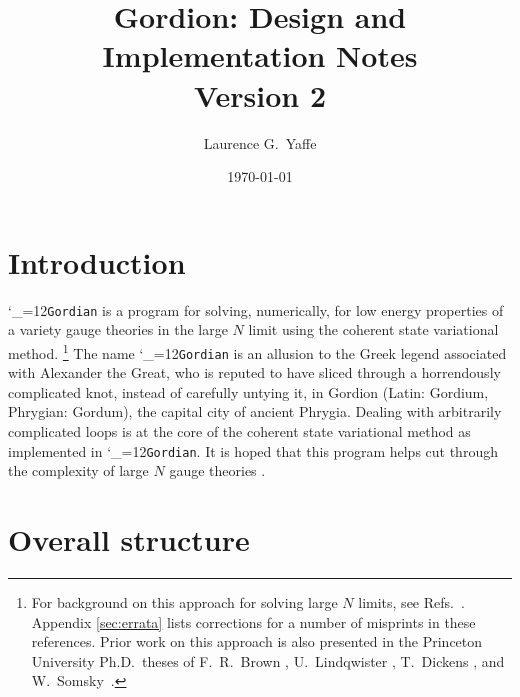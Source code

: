 \documentclass [12pt]{article}
\title
    {
    Gordion: Design and Implementation Notes
    \\[8pt]
    \large Version 2
    }
\date	{\small\today\vspace*{-30pt}}
\author	{Laurence G.~Yaffe}
\affil{%
    \small
    Department of Physics, University of Washington, Seattle WA 98195, USA
    \vspace*{-10pt}
    }%
\makeatletter
\renewcommand{\tt}{\begingroup\catcode`_=12\def\_{\string_}\tt@}
\newcommand{\tt@}[1]{\texttt{#1}\endgroup}
\makeatother
\begin{document}
\maketitle
\tableofcontents
\newpage
\setlength{\parskip}{5pt plus 2pt minus 1pt}

\section {Introduction}

\tt{Gordian} is a program for solving, numerically,
for low energy properties of
a variety gauge theories in the large $N$ limit using the
coherent state variational method.%
\footnote
    {%
    For background on this approach for solving large $N$ limits,
    see Refs.~\cite{YaffeRMP, CSVAI, CSVAII,Yaffe:2026ouz}.
    Appendix \ref{sec:errata} lists corrections for
    a number of misprints in these references.
    Prior work on this approach is also presented
    in the Princeton University Ph.D.~theses
    of F.~R.~Brown \cite{Brown:1987km},
    U.~Lindqwister \cite {Lindqwister:1988xc},
    T.~Dickens \cite{Dickens:1987ih},
    and W.~Somsky~\cite{Somsky:1989}.
    }
The name \tt{Gordian} is an allusion to the Greek legend
associated with Alexander the Great, who
is reputed to have sliced through a horrendously complicated
knot, instead of carefully untying it,
in Gordion (Latin: Gordium, Phrygian: Gordum),
the capital city of ancient Phrygia.
Dealing with arbitrarily complicated loops is at the
core of the coherent state variational method as
implemented in \tt{Gordian}.
It is hoped that this program helps cut through
the complexity of large $N$ gauge theories
{\large\smiley{}}.

\setlength{\parskip}{3pt}

\section {Overall structure}
\end{document}
